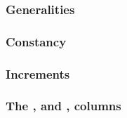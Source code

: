 
\subsubsection{Generalities}                                                                 \label{hub: system: hub stamp: generalities}                 
\subsubsection{Constancy}                                                                    \label{hub: system: hub stamp: constancy}                    
\subsubsection{Increments}                                                                   \label{hub: system: hub stamp: increments}                   
\subsubsection{The \tli, \tliCounter{} and \nonStackRows, \nonStackRowsCounter{} columns}    \label{hub: system: hub stamp: counters}                     
